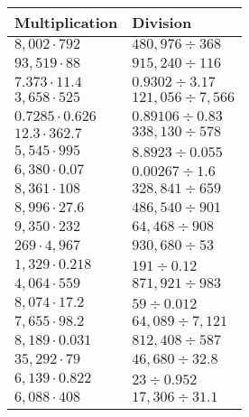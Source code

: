 \begin{longtable}[]{@{}ll@{}}
\toprule
Multiplication & Division\tabularnewline
\midrule
\endhead
\(8,002\cdot792\) & \(480,976÷368\)\tabularnewline
\(93,519\cdot88\) & \(915,240 ÷116\)\tabularnewline
\(7.373\cdot11.4\) & \(0.9302÷3.17\)\tabularnewline
\(3,658\cdot525\) & \(121,056÷7,566\)\tabularnewline
\(0.7285\cdot0.626\) & \(0.89106÷0.83\)\tabularnewline
\(12.3\cdot362.7\) & \(338,130÷578\)\tabularnewline
\(5,545\cdot995\) & \(8.8923÷0.055\)\tabularnewline
\(6,380\cdot0.07\) & \(0.00267÷1.6\)\tabularnewline
\(8,361\cdot108\) & \(328,841÷659\)\tabularnewline
\(8,996\cdot27.6\) & \(486,540÷901\)\tabularnewline
\(9,350\cdot232\) & \(64,468÷908\)\tabularnewline
\(269\cdot4,967\) & \(930,680÷53\)\tabularnewline
\(1,329\cdot0.218\) & \(191÷0.12\)\tabularnewline
\(4,064\cdot559\) & \(871,921÷983\)\tabularnewline
\(8,074\cdot17.2\) & \(59÷0.012\)\tabularnewline
\(7,655\cdot98.2\) & \(64,089÷7,121\)\tabularnewline
\(8,189\cdot0.031\) & \(812,408÷587\)\tabularnewline
\(35,292\cdot79\) & \(46,680÷32.8\)\tabularnewline
\(6,139\cdot0.822\) & \(23÷0.952\)\tabularnewline
\(6,088\cdot408\) & \(17,306÷31.1\)\tabularnewline
\bottomrule
\end{longtable}
